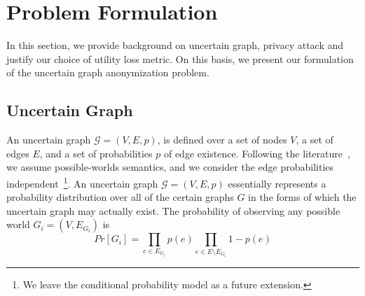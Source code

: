 \section{Problem Formulation}
\label{sec:notation}

In this section, we provide background on uncertain graph, privacy attack and justify our choice of utility loss metric. 
On this basis, we present our formulation of the uncertain graph anonymization problem. 

\vspace{-4pt}
\subsection{Uncertain Graph}
\vspace{-2.5pt}
An uncertain graph $\mathcal{G}=(V,E,\mathit{p})$, is defined over a set of nodes $V$, a set of edges $E$, and a set of probabilities $\mathit{p}$ of edge existence. Following the literature~\cite{Potamias_K_2010,Zhao_Detecting_2014,Colbourn_Colbourn_1987}, we assume possible-worlds semantics, and we consider the edge probabilities independent~\footnote{We leave the conditional probability model as a future
extension.}. An uncertain graph $\mathcal{G}=(V,E,\mathit{p})$ essentially represents a probability distribution over all of the certain graphs $G$ in the forms of which the uncertain graph may actually exist. 
The probability of observing any possible world $G_i=(V,E_{G_i})$ is    
\begin{equation*}
    Pr[G_i]=\prod_{e \in E_{G_i}} {\mathit{p}(e)} \prod_{e \in E \setminus E_{G_i}} 1-\mathit{p}(e)
\end{equation*}


